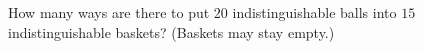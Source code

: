 How many ways are there to put $20$ indistinguishable balls into $15$ indistinguishable baskets? (Baskets may stay empty.)
